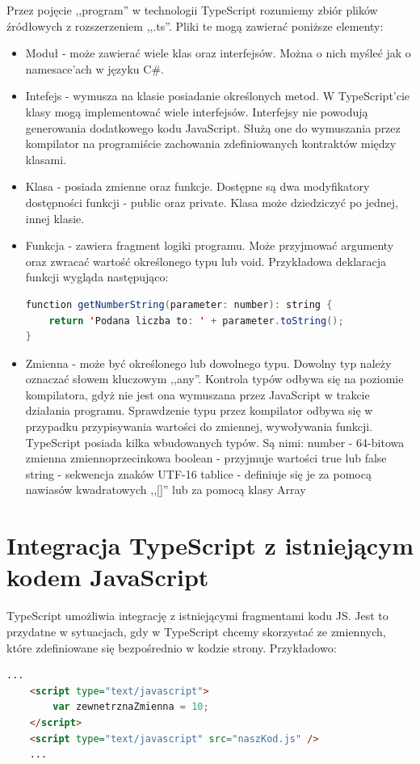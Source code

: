 Przez pojęcie ,,program'' w technologii TypeScript rozumiemy zbiór plików źródłowych z rozszerzeniem ,,.ts''. Pliki te mogą zawierać poniższe elementy:
\begin{itemize}
\item Moduł - może zawierać wiele klas oraz interfejsów. Można o nich myśleć jak o namesace'ach w języku C\#.
\item Intefejs - wymusza na klasie posiadanie określonych metod. W TypeScript'cie klasy mogą implementować wiele interfejsów. Interfejsy nie powodują generowania dodatkowego kodu JavaScript. Służą one do wymuszania przez kompilator na programiście zachowania zdefiniowanych kontraktów między klasami.
\item Klasa - posiada zmienne oraz funkcje. Dostępne są dwa modyfikatory dostępności funkcji - public oraz private. Klasa może dziedziczyć po jednej, innej klasie.
\item Funkcja - zawiera fragment logiki programu. Może przyjmować argumenty oraz zwracać wartość określonego typu lub void. Przykładowa deklaracja funkcji wygląda następująco:
\begin{lstlisting}[language=Java]
function getNumberString(parameter: number): string {
	return 'Podana liczba to: ' + parameter.toString();
}
\end{lstlisting}
\item Zmienna - może być określonego lub dowolnego typu. Dowolny typ należy oznaczać słowem kluczowym ,,any''. Kontrola typów odbywa się na poziomie kompilatora, gdyż nie jest ona wymuszana przez JavaScript w trakcie działania programu. Sprawdzenie typu przez kompilator odbywa się w przypadku przypisywania wartości do zmiennej, wywoływania funkcji. TypeScript posiada kilka wbudowanych typów. Są nimi:
\subitem number - 64-bitowa zmienna zmiennoprzecinkowa
\subitem boolean - przyjmuje wartości true lub false
\subitem string - sekwencja znaków UTF-16
\subitem tablice - definiuje się je za pomocą nawiasów kwadratowych ,,[]'' lub za pomocą klasy Array
\end{itemize}

\section{Integracja TypeScript z istniejącym kodem JavaScript}
TypeScript umożliwia integrację z istniejącymi fragmentami kodu JS. Jest to przydatne w sytuacjach, gdy w TypeScript chcemy skorzystać ze zmiennych, które zdefiniowane się bezpośrednio w kodzie strony. Przykładowo:
\begin{lstlisting}[language=HTML]
	...
	<script type="text/javascript">
		var zewnetrznaZmienna = 10;
	</script>
	<script type="text/javascript" src="naszKod.js" />
	...
\end{lstlisting}

